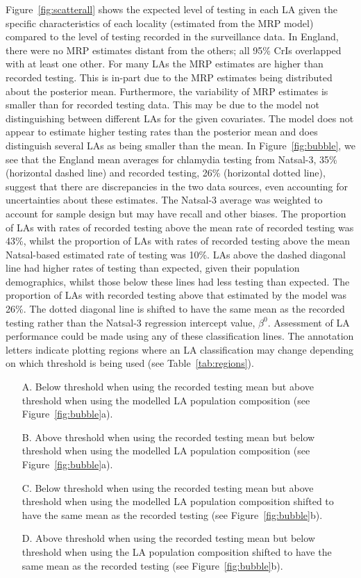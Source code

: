 \documentclass[fleqn,10pt]{wlscirep}
\begin{document}
Figure~\ref{fig:scatterall} shows the expected level of testing in each LA given the specific characteristics of each locality (estimated from the MRP model) compared to the level of testing recorded in the surveillance data. In England, there were no MRP estimates distant from the others; all 95\% CrIs overlapped with at least one other. For many LAs the MRP estimates are higher than recorded testing. This is in-part due to the MRP estimates being distributed about the posterior mean. Furthermore, the variability of MRP estimates is smaller than for recorded testing data. This may be due to the model not distinguishing between different LAs for the given covariates. The model does not appear to estimate higher testing rates than the posterior mean and does distinguish several LAs as being smaller than the mean. In Figure~\ref{fig:bubble}, we see that the England mean averages for chlamydia testing from Natsal-3, 35\% (horizontal dashed line) and recorded testing, 26\% (horizontal dotted line), suggest that there are discrepancies in the two data sources, even accounting for uncertainties about these estimates. The Natsal-3 average was weighted to account for sample design but may have recall and other biases. The proportion of LAs with rates of recorded testing above the mean rate of recorded testing was 43\%, whilst the proportion of LAs with rates of recorded testing above the mean Natsal-based estimated rate of testing was 10\%. LAs above the dashed diagonal line had higher rates of testing than expected, given their population demographics, whilst those below these lines had less testing than expected. The proportion of LAs with recorded testing above that estimated by the model was 26\%. 
The dotted diagonal line is shifted to have the same mean as the recorded testing rather than the Natsal-3 regression intercept value, $\beta^0$. Assessment of LA performance could be made using any of these classification lines. 
The annotation letters indicate plotting regions where an LA classification may change depending on which threshold is being used (see Table~\ref{tab:regions}).
\begin{itemize}
\item[A.]	Below threshold when using the recorded testing mean but above threshold when using the modelled LA population composition (see Figure~\ref{fig:bubble}a).
\item[B.]	Above threshold when using the recorded testing mean but below threshold when using the modelled LA population composition (see Figure~\ref{fig:bubble}a).
\item[C.]	Below threshold when using the recorded testing mean but above threshold when using the modelled LA population composition shifted to have the same mean as the recorded testing (see Figure~\ref{fig:bubble}b).
\item[D.]	Above threshold when using the recorded testing mean but below threshold when using the LA population composition shifted to have the same mean as the recorded testing (see Figure~\ref{fig:bubble}b).
\end{itemize}
\end{document}
